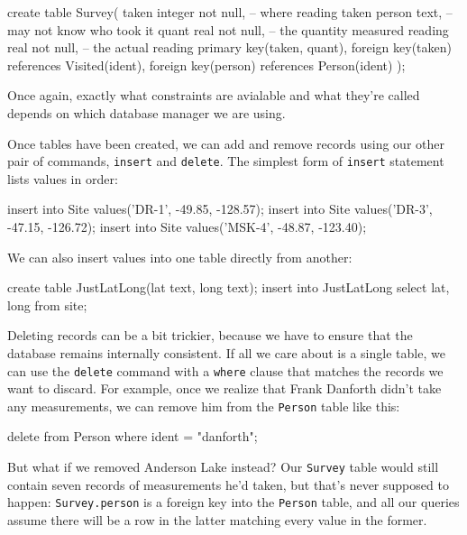 \begin{VerbIn}
create table Survey(
    taken   integer not null, -- where reading taken
    person  text,             -- may not know who took it
    quant   real not null,    -- the quantity measured
    reading real not null,    -- the actual reading
    primary key(taken, quant),
    foreign key(taken) references Visited(ident),
    foreign key(person) references Person(ident)
);
\end{VerbIn}

Once again, exactly what constraints are avialable and what they're
called depends on which database manager we are using.

Once tables have been created, we can add and remove records using our
other pair of commands, \texttt{insert} and \texttt{delete}. The
simplest form of \texttt{insert} statement lists values in order:

\begin{VerbIn}
insert into Site values('DR-1', -49.85, -128.57);
insert into Site values('DR-3', -47.15, -126.72);
insert into Site values('MSK-4', -48.87, -123.40);
\end{VerbIn}

We can also insert values into one table directly from another:

\begin{VerbIn}
create table JustLatLong(lat text, long text);
insert into JustLatLong select lat, long from site;
\end{VerbIn}

Deleting records can be a bit trickier, because we have to ensure that
the database remains internally consistent. If all we care about is a
single table, we can use the \texttt{delete} command with a
\texttt{where} clause that matches the records we want to discard. For
example, once we realize that Frank Danforth didn't take any
measurements, we can remove him from the \texttt{Person} table like
this:

\begin{VerbIn}
delete from Person where ident = "danforth";
\end{VerbIn}

But what if we removed Anderson Lake instead? Our \texttt{Survey} table
would still contain seven records of measurements he'd taken, but that's
never supposed to happen: \texttt{Survey.person} is a foreign key into
the \texttt{Person} table, and all our queries assume there will be a
row in the latter matching every value in the former.

